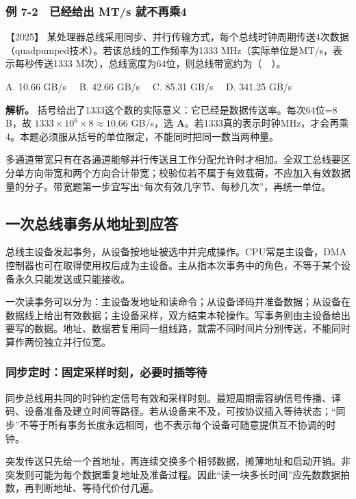 \subsubsection{例 7-2　已经给出 MT/s 就不再乘4}\label{co-ex7-2}

\noindent{}【2025】 某处理器总线采用同步、并行传输方式，每个总线时钟周期传送4次数据（quadpumped技术）。若该总线的工作频率为1333 MHz（实际单位是MT/s，表示每秒传送1333 M次），总线宽度为64位，则总线带宽约为（　）。

A. 10.66 GB/s　 B. 42.66 GB/s　 C. 85.31 GB/s　 D. 341.25 GB/s


\textbf{解析。} 括号给出了1333这个数的实际意义：它已经是数据传送率。每次64位=8 B，故 \(1333\times10^6\times8\approx10.66\) GB/s，选 \textbf{A}。若1333真的表示时钟MHz，才会再乘4。本题必须服从括号的单位限定，不能同时把同一数当两种量。

多通道带宽只有在各通道能够并行传送且工作分配允许时才相加。全双工总线要区分单方向带宽和两个方向合计带宽；校验位若不属于有效载荷，不应加入有效数据量的分子。带宽题第一步宜写出``每次有效几字节、每秒几次''，再统一单位。

\subsection{一次总线事务从地址到应答}\label{co-07-02}

总线主设备发起事务，从设备按地址被选中并完成操作。CPU常是主设备，DMA控制器也可在取得使用权后成为主设备。主从指本次事务中的角色，不等于某个设备永久只能发送或只能接收。

一次读事务可以分为：主设备发地址和读命令；从设备译码并准备数据；从设备在数据线上给出有效数据；主设备采样，双方结束本轮操作。写事务则由主设备给出要写的数据。地址、数据若复用同一组线路，就需不同时间片分别传送，不能同时算作两份独立并行位宽。

\subsubsection{同步定时：固定采样时刻，必要时插等待}\label{ux540cux6b65ux5b9aux65f6ux56faux5b9aux91c7ux6837ux65f6ux523bux5fc5ux8981ux65f6ux63d2ux7b49ux5f85}

同步总线用共同的时钟约定信号有效和采样时刻。最短周期需容纳信号传播、译码、设备准备及建立时间等路径。若从设备来不及，可按协议插入等待状态；``同步''不等于所有事务长度永远相同，也不表示每个设备可随意提供互不协调的时钟。

突发传送只先给一个首地址，再连续交换多个相邻数据，摊薄地址和启动开销。非突发则可能为每个数据重复地址及准备过程。因此``读一块多长时间''应先数数据拍数，再判断地址、等待代价付几遍。

